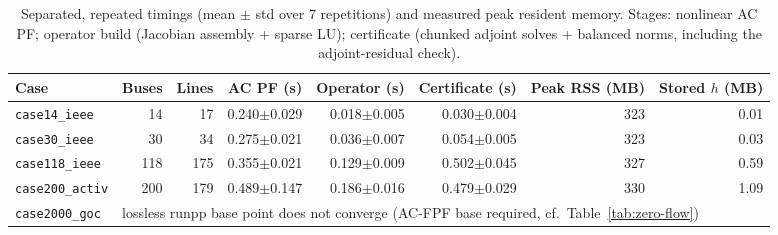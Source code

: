 \begin{table}[t]
\centering
\caption{Separated, repeated timings (mean $\pm$ std over 7 repetitions) and
measured peak resident memory.  Stages: nonlinear AC PF; operator build
(Jacobian assembly + sparse LU); certificate (chunked adjoint solves +
balanced norms, including the adjoint-residual check).
\label{tab:timing}}
\scriptsize
\begin{tabularx}{\textwidth}{@{}Xrrrrrrr@{}}
\toprule
Case & Buses & Lines & AC PF (s) & Operator (s) & Certificate (s) & Peak RSS (MB) & Stored $h$ (MB) \\
\midrule
\texttt{case14\_ieee} & 14 & 17 & 0.240$\pm$0.029 & 0.018$\pm$0.005 & 0.030$\pm$0.004 & 323 & 0.01 \\
\texttt{case30\_ieee} & 30 & 34 & 0.275$\pm$0.021 & 0.036$\pm$0.007 & 0.054$\pm$0.005 & 323 & 0.03 \\
\texttt{case118\_ieee} & 118 & 175 & 0.355$\pm$0.021 & 0.129$\pm$0.009 & 0.502$\pm$0.045 & 327 & 0.59 \\
\texttt{case200\_activ} & 200 & 179 & 0.489$\pm$0.147 & 0.186$\pm$0.016 & 0.479$\pm$0.029 & 330 & 1.09 \\
\texttt{case2000\_goc} & \multicolumn{7}{l}{lossless runpp base point does not converge (AC-FPF base required, cf.\ Table~\ref{tab:zero-flow})} \\
\bottomrule
\end{tabularx}
\end{table}
